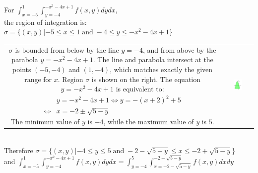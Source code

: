\documentclass{article}
\newcommand{\dr}[1]{\textcolor{dark_red}{#1}}
\begin{document}
\dr{\begin{framed}
For \(\int_{x = -5}^1 \int_{y = -4}^{-x^2 - 4x + 1} f(x,y)dydx\), \\
the region of integration is: \(\sigma = \{(x,y) | -5 \leq x \leq 1 \;\text{and}\; -4 \leq y \leq -x^2 - 4x + 1\}\) \\
\begin{tabular}{cc}
\parbox{0.6\textwidth}{
\(\sigma\) is bounded from below by the line \(y = -4\), and from above by the parabola \(y = -x^2 - 4x + 1\). The line and parabola intersect at the points \((-5,-4)\) and \((1,-4)\), which matches exactly the given range for \(x\). Region \(\sigma\) is shown on the right. The equation \(y = -x^2 - 4x + 1\) is equivalent to:
\begin{align*}
& y = -x^2 - 4x + 1 
\iff y = -(x + 2)^2 + 5 \\
\iff & x = -2 \pm \sqrt{5 - y}
\end{align*} 
The minimum value of \(y\) is \(-4\), while the maximum value of \(y\) is \(5\). 
} & \parbox{0.4\textwidth}{
\includegraphics[width = 0.3\textwidth]{Test_bench_part_3x_images/Test_bench_part_3x_Solutions_image_15}
}
\end{tabular} \\
Therefore \(\sigma = \{(x,y) | -4 \leq y \leq 5 \;\text{and}\; -2 - \sqrt{5 - y} \leq x \leq -2 + \sqrt{5 - y}\}\) \\
and \(\int_{x = -5}^1 \int_{y = -4}^{-x^2 - 4x + 1} f(x,y)dydx = \int_{y = -4}^5 \int_{x = -2 - \sqrt{5 - y}}^{-2 + \sqrt{5 - y}} f(x,y)dxdy\)
\end{framed}}
\end{document}
